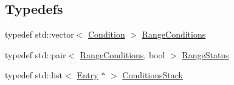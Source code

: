 \subsection*{Typedefs}
\begin{DoxyCompactItemize}
\item 
typedef std::vector$<$ \hyperlink{class_d_d4hep_1_1_conditions_1_1_condition}{Condition} $>$ \hyperlink{namespace_d_d4hep_1_1_conditions_ae765f0140a33973a430280f02b6062f4}{RangeConditions}
\item 
typedef std::pair$<$ \hyperlink{namespace_d_d4hep_1_1_conditions_ae765f0140a33973a430280f02b6062f4}{RangeConditions}, bool $>$ \hyperlink{namespace_d_d4hep_1_1_conditions_a6fa51615b9757a9ffccb7377f0617ee4}{RangeStatus}
\item 
typedef std::list$<$ \hyperlink{class_d_d4hep_1_1_conditions_1_1_entry}{Entry} $\ast$ $>$ \hyperlink{namespace_d_d4hep_1_1_conditions_ac894ba79dbc97adf0ab8143bdd8bd2e3}{ConditionsStack}
\end{DoxyCompactItemize}
